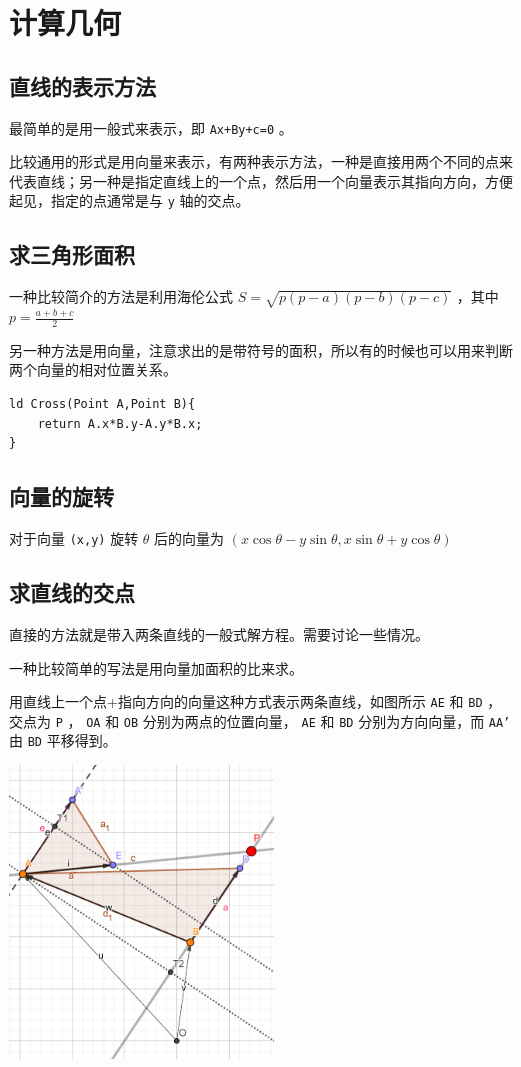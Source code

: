 \documentclass[UTF-8]{ctexart}
\begin{document}
\section{计算几何}
	\subsection{直线的表示方法}
	最简单的是用一般式来表示，即 \texttt{Ax+By+c=0} 。  
	
	比较通用的形式是用向量来表示，有两种表示方法，一种是直接用两个不同的点来代表直线；另一种是指定直线上的一个点，然后用一个向量表示其指向方向，方便起见，指定的点通常是与 \texttt{y} 轴的交点。
	\subsection{求三角形面积}
	
	一种比较简介的方法是利用海伦公式 $S=\sqrt{p(p-a)(p-b)(p-c)}$ ，其中 $p=\frac{a+b+c}{2}$
	
	另一种方法是用向量，注意求出的是带符号的面积，所以有的时候也可以用来判断两个向量的相对位置关系。
	
\begin{verbatim}
ld Cross(Point A,Point B){
    return A.x*B.y-A.y*B.x;
}
\end{verbatim}
	
	\subsection{向量的旋转}
	对于向量 \texttt{(x,y)} 旋转 $\theta$ 后的向量为 $(x\cos\theta-y\sin\theta,x\sin\theta+y\cos\theta)$
	
	\subsection{求直线的交点}
	直接的方法就是带入两条直线的一般式解方程。需要讨论一些情况。  
	
	一种比较简单的写法是用向量加面积的比来求。
	  
	用直线上一个点+指向方向的向量这种方式表示两条直线，如图所示 \texttt{AE} 和 \texttt{BD} ，交点为 \texttt{P} ， \texttt{OA} 和 \texttt{OB} 分别为两点的位置向量， \texttt{AE} 和 \texttt{BD} 分别为方向向量，而 \texttt{AA'} 由 \texttt{BD} 平移得到。
	
	\begin{center}
		\includegraphics[width=7cm]{file//point.png}
	\end{center}
\end{document}

